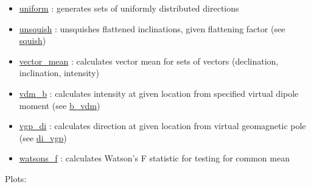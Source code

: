 \documentclass[11pt]{book}
\begin{document}
{{\begin{itemize}
\item \href{https://pmagpy.github.io/PmagPy_calculations.html#uniform}{uniform} : generates sets of uniformly distributed directions
\item \href{https://pmagpy.github.io/PmagPy_calculations.html#unsquish}{unsquish} : unsquishes flattened inclinations, given flattening factor (see \href{https://pmagpy.github.io/PmagPy_calculations.html#squish}{squish})
\item \href{https://pmagpy.github.io/PmagPy_calculations.html#vector_mean}{vector\_mean} : calculates vector mean for sets of vectors (declination, inclination, intensity)
\item \href{https://pmagpy.github.io/PmagPy_calculations.html#vdm_b}{vdm\_b} : calculates intensity at given location from specified virtual dipole moment (see \href{https://pmagpy.github.io/PmagPy_calculations.html#b_vdm}{b\_vdm})
\item \href{https://pmagpy.github.io/PmagPy_calculations.html#vgp_di}{vgp\_di} : calculates direction at given location from virtual geomagnetic pole (see \href{https://pmagpy.github.io/PmagPy_calculations.html#di_vgp}{di\_vgp})
\item \href{https://pmagpy.github.io/PmagPy_calculations.html#watsons_f}{watsons\_f} : calculates Watson's F statistic for testing for common mean

  \end{itemize}

Plots:

\begin{itemize}


\end{itemize}}}
\end{document}
